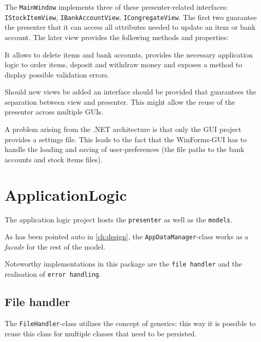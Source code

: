 

The \texttt{MainWindow} implements three of these presenter-related interfaces: \texttt{IStockItemView}, \texttt{IBankAccountView}, \texttt{ICongregateView}. The first two guarantee the presenter that it can access all attributes needed to update an item or bank account. The later view provides the following methods and properties:



It allows to delete items and bank accounts, provides the necessary application logic to order items, deposit and withdraw money and exposes a method to display possible validation errors.

Should new views be added an interface should be provided that guarantees the separation between view and presenter. This might allow the reuse of the presenter across multiple \ac{GUI}s.

A problem arising from the .NET architecture is that only the \ac{GUI} project provides a settings file. This leads to the fact that the WinForms-\ac{GUI} has to handle the loading and saving of user-preferences (the file paths to the bank accounts and stock items files).

\section{ApplicationLogic}
\label{sec:application_logic}

The application logic project hosts the \texttt{presenter} as well as the \texttt{models}.

As has been pointed auto in \autoref{ch:design}, the \texttt{AppDataManager}-class works as a \textit{facade} for the rest of the model.

Noteworthy implementations in this package are the \texttt{file handler} and the realisation of \texttt{error handling}.

\subsection{File handler}
\label{subsec:filehandler}

The \texttt{FileHandler}-class utilizes the concept of generics: this way it is possible to reuse this class for multiple classes that need to be persisted.


